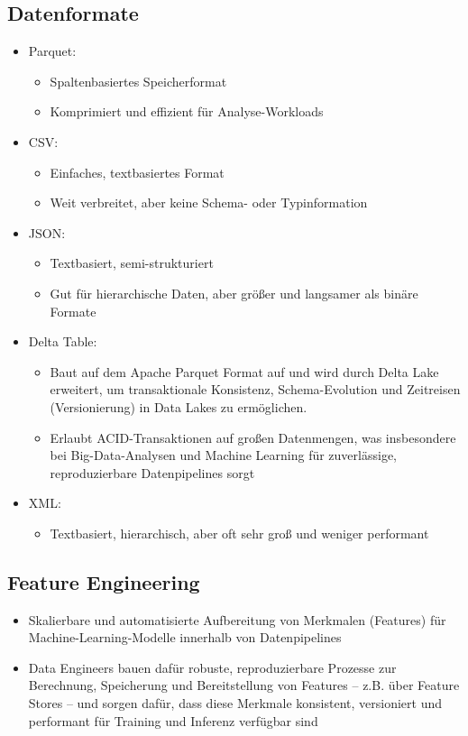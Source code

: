 \documentclass[11pt]{scrartcl}
\begin{document}
\subsection{Datenformate}
\begin{itemize}
	\item Parquet:
	\begin{itemize}
		\item Spaltenbasiertes Speicherformat
		\item Komprimiert und effizient für Analyse-Workloads
	\end{itemize}
	\item CSV:
	\begin{itemize}
		\item Einfaches, textbasiertes Format
		\item Weit verbreitet, aber keine Schema- oder Typinformation
	\end{itemize}
	\item JSON:
	\begin{itemize}
		\item Textbasiert, semi-strukturiert
		\item Gut für hierarchische Daten, aber größer und langsamer als binäre Formate
	\end{itemize}
	\item Delta Table:
	\begin{itemize}
		\item Baut auf dem Apache Parquet Format auf und wird durch Delta Lake erweitert, um transaktionale Konsistenz, Schema-Evolution und Zeitreisen (Versionierung) in Data Lakes zu ermöglichen.
		\item Erlaubt ACID-Transaktionen auf großen Datenmengen, was insbesondere bei Big-Data-Analysen und Machine Learning für zuverlässige, reproduzierbare Datenpipelines sorgt
	\end{itemize}
	\item XML:
	\begin{itemize}
		\item Textbasiert, hierarchisch, aber oft sehr groß und weniger performant
	\end{itemize}
\end{itemize}


\subsection{Feature Engineering}
\begin{itemize}
	\item Skalierbare und automatisierte Aufbereitung von Merkmalen (Features) für Machine-Learning-Modelle innerhalb von Datenpipelines
	\item Data Engineers bauen dafür robuste, reproduzierbare Prozesse zur Berechnung, Speicherung und Bereitstellung von Features – z.B. über Feature Stores – und sorgen dafür, dass diese Merkmale konsistent, versioniert und performant für Training und Inferenz verfügbar sind
\end{itemize}
\end{document}

